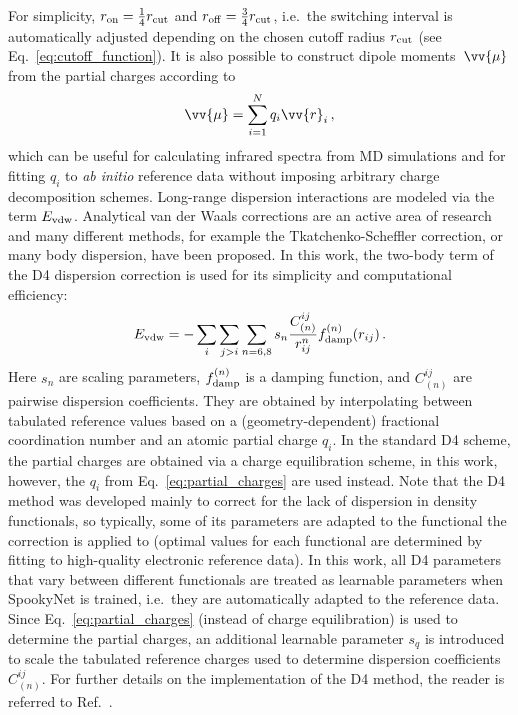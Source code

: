 \documentclass[%
superscriptaddress,
reprint,
nofootinbib,
amsmath,amssymb,amsfonts,
floatfix,
altaffilletter,
showkeys,
]{revtex4-2}
\newcommand{\nn}{SpookyNet}
\begin{document}
For simplicity, $r_{\rm on} = \frac{1}{4}r_{\rm cut}$ and $r_{\rm off} = \frac{3}{4}r_{\rm cut}$, i.e.\ the switching interval is automatically adjusted depending on the chosen cutoff radius $r_{\rm cut}$ (see Eq.~\ref{eq:cutoff_function}). It is also possible to construct dipole moments~$\vv{\mu}$ from the partial charges according to
\begin{equation}
\vv{\mu} = \sum_{i=1}^{N} q_i \vv{r}_i\,,
\label{eq:dipole}
\end{equation}
which can be useful for calculating infrared spectra from MD simulations and for fitting $q_i$ to \textit{ab initio} reference data without imposing arbitrary charge decomposition schemes.\cite{gastegger2017machine}  Long-range dispersion interactions are modeled via the term $E_{\rm vdw}$. Analytical van der Waals corrections are an active area of research and many different methods, for example the Tkatchenko-Scheffler correction,\cite{tkatchenko2009accurate} or many body dispersion,\cite{tkatchenko2012accurate} have been proposed.\cite{hermann2017first} In this work, the two-body term of the D4 dispersion correction\cite{caldeweyher2019generally} is used for its simplicity and computational efficiency:
\begin{equation}
E_{\rm vdw} = - \sum_{i}\sum_{j>i} \sum_{n=6,8}s_n \frac{C^{ij}_{(n)}}{r_{ij}^n}f_{\rm damp}^{(n)}(r_{ij})\,.
\label{eq:dispersion_term}
\end{equation}
Here $s_n$ are scaling parameters, $f_{\rm damp}^{(n)}$ is a damping function, and $C^{ij}_{(n)}$ are pairwise dispersion coefficients. They are obtained by interpolating between tabulated reference values based on a (geometry-dependent) fractional coordination number and an atomic partial charge $q_i$. In the standard D4 scheme, the partial charges are obtained via a charge equilibration scheme,\cite{caldeweyher2019generally} in this work, however, the $q_i$ from Eq.~\ref{eq:partial_charges} are used instead. Note that the D4 method was developed mainly to correct for the lack of dispersion in density functionals, so typically, some of its parameters are adapted to the functional the correction is applied to (optimal values for each functional are determined by fitting to high-quality electronic reference data).\cite{caldeweyher2019generally} In this work, all D4 parameters that vary between different functionals are treated as learnable parameters when \nn{} is trained, i.e.\ they are automatically adapted to the reference data. Since Eq.~\ref{eq:partial_charges} (instead of charge equilibration) is used to determine the partial charges, an additional learnable parameter $s_q$ is introduced to scale the tabulated reference charges used to determine dispersion coefficients $C^{ij}_{(n)}$. For further details on the implementation of the D4 method, the reader is referred to Ref.~.\\
\end{document}
